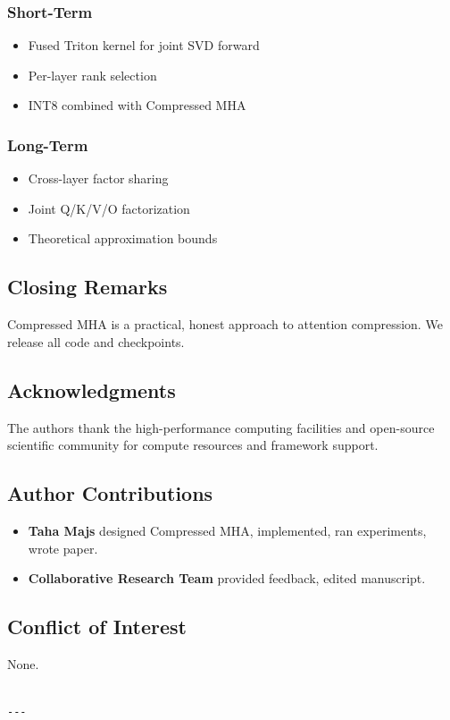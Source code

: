 \subsubsection{Short-Term}
\begin{itemize}
\item Fused Triton kernel for joint SVD forward
\item Per-layer rank selection
\item INT8 combined with Compressed MHA

\end{itemize}
\subsubsection{Long-Term}
\begin{itemize}
\item Cross-layer factor sharing
\item Joint Q/K/V/O factorization
\item Theoretical approximation bounds

\end{itemize}
\subsection{Closing Remarks}

Compressed MHA is a practical, honest approach to attention compression. We 
release all code and checkpoints.

\subsection{Acknowledgments}

The authors thank the high-performance computing facilities and open-source scientific community for compute resources and framework support.

\subsection{Author Contributions}

\begin{itemize}
\item \textbf{Taha Majs} designed Compressed MHA, implemented, ran experiments,
  wrote paper.
\item \textbf{Collaborative Research Team} provided feedback, edited manuscript.

\end{itemize}
\subsection{Conflict of Interest}

None.
\begin{lstlisting}

---
\end{lstlisting}